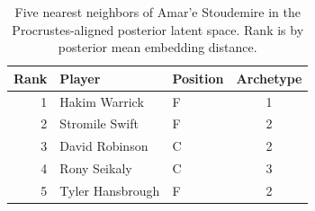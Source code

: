 \begin{table}[htbp]
  \centering\small
  \begin{tabular}{rllc}
    \toprule
    Rank & Player & Position & Archetype \\
    \midrule
    1 & Hakim Warrick & F & 1 \\
    2 & Stromile Swift & F & 2 \\
    3 & David Robinson & C & 2 \\
    4 & Rony Seikaly & C & 3 \\
    5 & Tyler Hansbrough & F & 2 \\
    \bottomrule
  \end{tabular}
  \caption{Five nearest neighbors of Amar'e Stoudemire in the Procrustes-aligned posterior latent space. Rank is by posterior mean embedding distance.}
  \label{tab:Amar_e_Stoudemire_neighbors}
\end{table}

